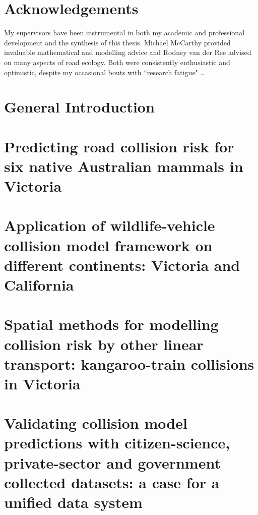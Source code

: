\documentclass[titlesmallcaps,copyrightpage,examinerscopy]{uomthesis}
\begin{document}
\chapter{Acknowledgements}

My supervisors have been instrumental in both my academic and professional development and the synthesis of this thesis.  Michael McCarthy provided invaluable mathematical and modelling advice and Rodney van der Ree advised on many aspects of road ecology.  Both were consistently enthusiastic and optimistic, despite my occasional bouts with ``research fatigue" \ldots

\tableofcontents
\listoffigures
\listoftables

\mainmatter

%
\chapter{General Introduction}\label{sec:intro}




%
\chapter{Predicting road collision risk for six native Australian mammals in Victoria}\label{sec:6sp}

%
\chapter{Application of wildlife-vehicle collision model framework on different continents: Victoria and California}\label{sec:cal}

%
\chapter{Spatial methods for modelling collision risk by other linear transport: kangaroo-train collisions in Victoria}\label{sec:train}

%
\chapter{Validating collision model predictions with citizen-science, private-sector and government collected datasets: a case for a unified data system}\label{sec:val}
\end{document}
